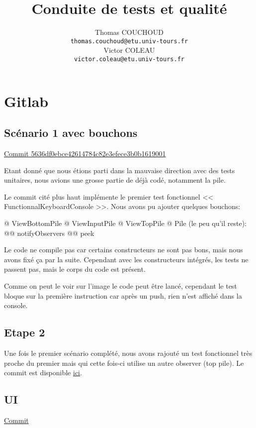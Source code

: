 \documentclass{report}
\title{Conduite de tests et qualité}
\author{Thomas COUCHOUD\\\texttt{thomas.couchoud@etu.univ-tours.fr}\\Victor COLEAU\\\texttt{victor.coleau@etu.univ-tours.fr}}
\begin{document}
	\mccTitle

	\chapter{Gitlab}
		\section{Scénario 1 avec bouchons}
			\href{https://gitlab.com/MrCraftCod/conduitedetests/commit/5636df0ebce42614784c82e3efece3b0b1619001}{Commit 5636df0ebce42614784c82e3efece3b0b1619001}
			
			Etant donné que nous étions parti dans la mauvaise direction avec des tests unitaires, nous avions une grosse partie de déjà codé, notamment la pile.
			
			Le commit cité plus haut implémente le premier test fonctionnel << FunctionnalKeyboardConsole >>.
			Nous avons pu ajouter quelques bouchons:
			\begin{easylist}
				@ ViewBottomPile
				@ ViewInputPile
				@ ViewTopPile
				@ Pile (le peu qu'il reste):
				@@ notifyObservers
				@@ peek
			\end{easylist}

			Le code ne compile pas car certains constructeurs ne sont pas bons, mais nous avons fixé ça par la suite.
			Cependant avec les constructeurs intégrés, les tests ne passent pas, mais le corps du code est présent.
			
			
			Comme on peut le voir sur l'image le code peut être lancé, cependant le test bloque sur la première instruction car après un push, rien n'est affiché dans la console.
			
		\section{Etape 2}
			Une fois le premier scénario complété, nous avons rajouté un test fonctionnel très proche du premier mais qui cette fois-ci utilise un autre observer (top pile).
			Le commit est disponible \href{https://gitlab.com/MrCraftCod/conduitedetests/commit/5d63a2e3a8d360577cf3c889b28c2f8fdbfb6765}{ici}.
			
			
		\section{UI}
			\href{https://gitlab.com/MrCraftCod/conduitedetests/commit/ba863b4bd56417faadcdba22ef20eaef2a78cba1}{Commit}
		
\end{document}
